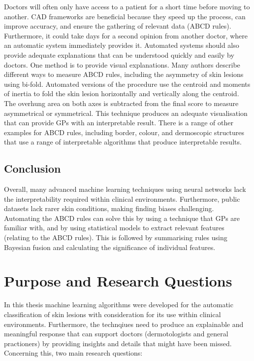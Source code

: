 Doctors will often only have access to a patient for a short time before moving to another. CAD frameworks are beneficial because they speed up the process, can improve accuracy\cite{Dick2019}, and ensure the gathering of relevant data (ABCD rules). Furthermore, it could take days for a second opinion from another doctor, where an automatic system immediately provides it. Automated systems should also provide adequate explanations that can be understood quickly and easily by doctors\cite{Lipton2018}. One method is to provide visual explanations. Many authors\cite{Zaqout2016, Kasmi2016, Ali2020a} describe different ways to measure ABCD rules, including the asymmetry of skin lesions using bi-fold. Automated versions of the procedure use the centroid and moments of inertia to fold the skin lesion horizontally and vertically along the centroid. The overhung area on both axes is subtracted from the final score to measure asymmetrical or symmetrical. This technique produces an adequate visualisation that can provide GPs with an interpretable result. There is a range of other examples for ABCD rules, including border\cite{Kasmi2016, Zaqout2016, Ali2020b}, colour\cite{She2007, Tenenhaus2010, Kasmi2016}, and dermoscopic structures\cite{Lopez-Labraca2018} that use a range of interpretable algorithms that produce interpretable results.






\subsection{Conclusion}
Overall, many advanced machine learning techniques using neural networks lack the interpretability required within clinical environments. Furthermore, public datasets lack rarer skin conditions, making finding biases challenging. Automating the ABCD rules can solve this by using a technique that GPs are familiar with, and by using statistical models to extract relevant features (relating to the ABCD rules). This is followed by summarising rules using Bayesian fusion and calculating the significance of individual features.

\section{Purpose and Research Questions}
In this thesis machine learning algorithms were developed for the automatic classification of skin lesions with consideration for its use within clinical environments. Furthermore, the technqiues need to produce an explainable and meaningful response that can support doctors (dermotologists and general practioners) by providing insights and details that might have been missed. Concerning this, two main research questions:

